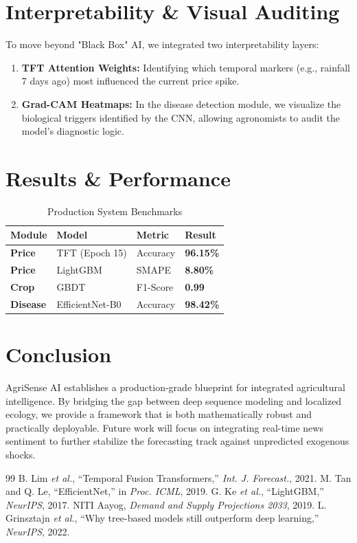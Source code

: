 \documentclass[conference]{IEEEtran}
\begin{document}
\section{Interpretability \& Visual Auditing}
To move beyond "Black Box" AI, we integrated two interpretability layers:
\begin{enumerate}
    \item \textbf{TFT Attention Weights:} Identifying which temporal markers (e.g., rainfall 7 days ago) most influenced the current price spike.
    \item \textbf{Grad-CAM Heatmaps:} In the disease detection module, we visualize the biological triggers identified by the CNN, allowing agronomists to audit the model's diagnostic logic.
\end{enumerate}

\section{Results \& Performance}
\begin{table}[h]
\centering
\caption{Production System Benchmarks}
\begin{tabular}{@{}llll@{}}
\toprule
\textbf{Module} & \textbf{Model} & \textbf{Metric} & \textbf{Result} \\ \midrule
\textbf{Price} & TFT (Epoch 15) & Accuracy & \textbf{96.15\%} \\
\textbf{Price} & LightGBM & SMAPE & \textbf{8.80\%} \\
\textbf{Crop} & GBDT & F1-Score & \textbf{0.99} \\
\textbf{Disease} & EfficientNet-B0 & Accuracy & \textbf{98.42\%} \\ \bottomrule
\end{tabular}
\end{table}

\section{Conclusion}
AgriSense AI establishes a production-grade blueprint for integrated agricultural intelligence. By bridging the gap between deep sequence modeling and localized ecology, we provide a framework that is both mathematically robust and practically deployable. Future work will focus on integrating real-time news sentiment to further stabilize the forecasting track against unpredicted exogenous shocks.

\begin{thebibliography}{99}
 B. Lim \emph{et al.}, ``Temporal Fusion Transformers,'' \emph{Int. J. Forecast.}, 2021.
 M. Tan and Q. Le, ``EfficientNet,'' in \emph{Proc. ICML}, 2019.
 G. Ke \emph{et al.}, ``LightGBM,'' \emph{NeurIPS}, 2017.
 NITI Aayog, \emph{Demand and Supply Projections 2033}, 2019.
 L. Grinsztajn \emph{et al.}, ``Why tree-based models still outperform deep learning,'' \emph{NeurIPS}, 2022.
\end{thebibliography}
\end{document}
